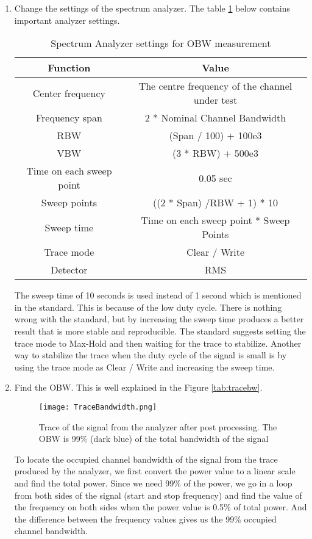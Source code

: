 \begin{enumerate}
\item Change the settings of the spectrum analyzer. The table \ref{tab:analyzer} below contains important analyzer settings.
\begin{table}[ht]
\begin{center}
\begin {tabular} {|c|c|} 
\toprule
Function & Value \\ 
\midrule 
Center frequency & The centre frequency of the channel under test \\
Frequency span &2 * Nominal Channel Bandwidth \\
\ac{RBW} & (Span / 100) + 100e3 \\
\ac{VBW} & (3 * RBW) + 500e3\\
Time on each sweep point & 0.05 sec\\
Sweep points & ((2 * Span) /RBW + 1) * 10\\
Sweep time & Time on each sweep point * Sweep Points \\
Trace mode & Clear / Write\\
Detector & \ac{RMS}\\
\bottomrule
\end{tabular} 
\caption{Spectrum Analyzer settings for \ac{OBW} measurement}
\label{tab:analyzer}
\end{center}
\end{table}
The sweep time of 10 seconds is used instead of 1 second which is mentioned in the standard. This is because of the low duty cycle. There is nothing wrong with the standard, but by increasing the sweep time produces a better result that is more stable and reproducible. The standard suggests setting the trace mode to Max-Hold and then waiting for the trace to stabilize. Another way to stabilize the trace when the duty cycle of the signal is small is by using the trace mode as Clear / Write and increasing the sweep time.

\item Find the \ac{OBW}. This is well explained in the Figure \ref{tab:tracebw}.
\begin{figure}[H]
\centering
\texttt{[image: TraceBandwidth.png]}
\caption{Trace of the signal from the analyzer after post processing. The \acs{OBW} is 99\% (dark blue) of the total bandwidth of the signal}
\label{fig:tracebw}
\end{figure}
To locate the occupied channel bandwidth of the signal from the trace produced by the analyzer, we first convert the power value to a linear scale and find the total power. Since we need 99\% of the power, we go in a loop from both sides of the signal (start and stop frequency) and find the value of the frequency on both sides when the power value is 0.5\% of total power. And the difference between the frequency values gives us the 99\% occupied channel bandwidth.
\end{enumerate}
  
